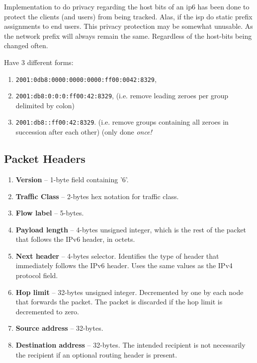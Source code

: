 Implementation to do privacy regarding the host bits of an \gls{ip6} has been done to protect the clients (and users) from being tracked. Alas, if the \gls{isp} do static prefix assignments to end users. This privacy protection may be somewhat unusable. As the network prefix will always remain the same. Regardless of the host-bits being changed often.

Have 3 different forms:
\begin{enumerate}
    \item \texttt{2001:0db8:0000:0000:0000:ff00:0042:8329},
    \item \texttt{2001:db8:0:0:0:ff00:42:8329}, {\footnotesize (i.e. remove leading zeroes per group delimited by colon)}
    \item \texttt{2001:db8::ff00:42:8329}. {\footnotesize (i.e. remove groups containing all zeroes in succession after each other) (only done \textit{once!}}
\end{enumerate}

\subsection{Packet Headers}\cite{IPv6Pack77:online}


\begin{enumerate}
    \item \textbf{Version} -- 1-byte field containing '6'.
    \item \textbf{Traffic Class} -- 2-bytes hex notation for traffic class.
    \item \textbf{Flow label} -- 5-bytes.
    \item \textbf{Payload length} -- 4-bytes unsigned integer, which is the rest of the packet that follows the IPv6 header, in octets.
    \item \textbf{Next header} -- 4-bytes selector. Identifies the type of header that immediately follows the IPv6 header. Uses the same values as the IPv4 protocol field.
    \item \textbf{Hop limit} -- 32-bytes unsigned integer. Decremented by one by each node that forwards the packet. The packet is discarded if the hop limit is decremented to zero.
    \item \textbf{Source address} -- 32-bytes.
    \item \textbf{Destination address} -- 32-bytes. The intended recipient is not necessarily the recipient if an optional routing header is present.
\end{enumerate}

